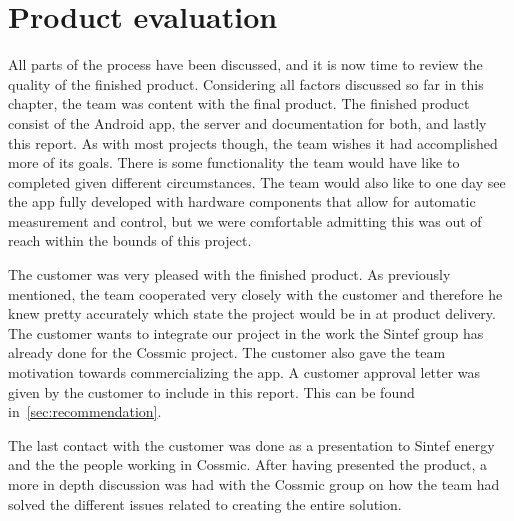 \section{Product evaluation}
All parts of the process have been discussed, and it is now time to review the quality of the finished product. Considering all factors discussed so far in this chapter, the team was content with the final product. The finished product consist of the Android app, the server and documentation for both, and lastly this report. As with most projects though, the team wishes it had accomplished more of its goals. There is some functionality the team would have like to completed given different circumstances. The team would also like to one day see the app fully developed with hardware components that allow for automatic measurement and control, but we were comfortable admitting this was out of reach within the bounds of this project. 

The customer was very pleased with the finished product. As previously mentioned, the team cooperated very closely with the customer and therefore he knew pretty accurately which state the project would be in at product delivery. The customer wants to integrate our project in the work the Sintef group has already done for the Cossmic project. The customer also gave the team motivation towards commercializing the app. A customer approval letter was given by the customer to include in this report. This can be found in~\ref{sec:recommendation}.

The last contact with the customer was done as a presentation to Sintef energy and the the people working in Cossmic. After having presented the product, a more in depth discussion was had with the Cossmic group on how the team had solved the different issues related to creating the entire solution. 
